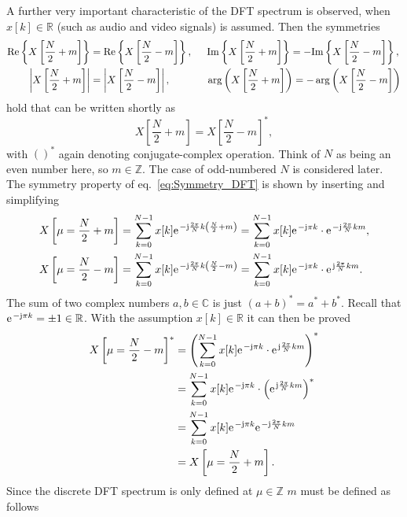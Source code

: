 \documentclass[11pt,a4paper,DIV=12]{scrartcl}
\begin{document}
A further very important characteristic of the DFT spectrum is observed,
when $x[k]\in\mathbb{R}$ (such as audio and video signals) is assumed.
%
Then the symmetries
\begin{align}
\text{Re}\left\{X\left[\frac{N}{2}+m\right]\right\}&=\text{Re}\left\{X\left[\frac{N}{2}-m\right]\right\}, \hspace{5mm} \text{Im}\left\{X\left[\frac{N}{2}+m\right]\right\}=-\text{Im}\left\{X\left[\frac{N}{2}-m\right]\right\},\\
\left|X\left[\frac{N}{2}+m\right]\right|&=\left|X\left[\frac{N}{2}-m\right]\right|, \hspace{1.3cm} \arg\left(X\left[\frac{N}{2}+m\right]\right)=-\arg\left(X\left[\frac{N}{2}-m\right]\right)
\end{align}
%
hold that can be written shortly as
%
\begin{equation}
X\left[\frac{N}{2}+m\right]=X\left[\frac{N}{2}-m\right]^*,
\label{eq:Symmetry_DFT}
\end{equation}
%
with $()^*$ again denoting conjugate-complex operation.
%
Think of $N$ as being an even number here, so $m\in \mathbb{Z}$.
%
The case of odd-numbered $N$ is considered later.
%
The symmetry property of eq.~\eqref{eq:Symmetry_DFT} is shown by inserting and
simplifying
\begin{align}
X\left[\mu=\frac{N}{2}+m\right]&=\sum_{k=0}^{N-1}x[k]\e^{-\im\frac{2\pi}{N}k{\left(\frac{N}{2}+m\right)}}=\sum_{k=0}^{N-1}x[k]\e^{-\im\pi k}\cdot\e^{-\im\frac{2\pi}{N}km},\\
X\left[\mu=\frac{N}{2}-m\right]&=\sum_{k=0}^{N-1}x[k]\e^{-\im\frac{2\pi}{N}k{\left(\frac{N}{2}-m\right)}}=\sum_{k=0}^{N-1}x[k]\e^{-\im\pi k}\cdot\e^{\im\frac{2\pi}{N}km}.
\end{align}
%
The sum of two complex numbers $a,b\in\mathbb{C}$ is just $(a+b)^*=a^*+b^*$.
Recall that $\e^{-\im\pi k}=\pm 1\in\mathbb{R}$.
%
With the assumption $x[k]\in\mathbb{R}$ it can then be proved
\begin{align}
X\left[\mu=\frac{N}{2}-m\right]^*&=\left(\sum_{k=0}^{N-1}x[k]\e^{-\im\pi k}\cdot\e^{\im\frac{2\pi}{N}km}\right)^*\\
&=\sum_{k=0}^{N-1}x[k]\e^{-\im\pi k}\cdot\left(\e^{\im\frac{2\pi}{N}km}\right)^*\\
&=\sum_{k=0}^{N-1}x[k]\e^{-\im\pi k}\e^{-\im\frac{2\pi}{N}km}\\
&=X\left[\mu=\frac{N}{2}+m\right].
\end{align}
%
Since the discrete DFT spectrum is only defined at $\mu\in\mathbb{Z}$
$m$ must be defined as follows
\end{document}
